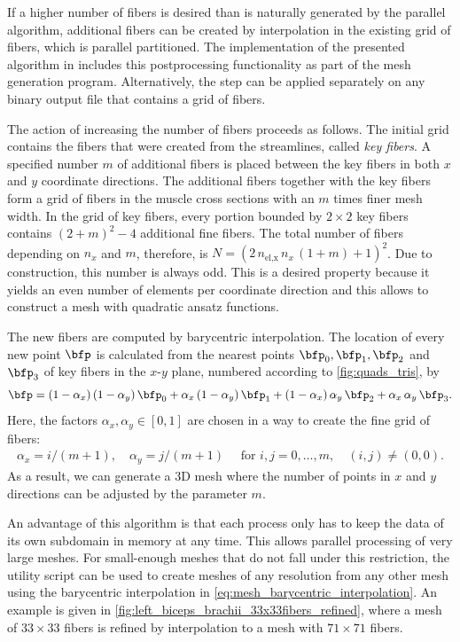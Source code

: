 If a higher number of fibers is desired than is naturally generated by the parallel algorithm, additional fibers can be created by interpolation in the existing grid of fibers, which is parallel partitioned. The implementation of the presented algorithm in \opendihu{} includes this postprocessing functionality as part of the mesh generation program. Alternatively, the step can be applied separately on any binary output file that contains a grid of fibers. 

The action of increasing the number of fibers proceeds as follows. The initial grid contains the fibers that were created from the streamlines, called \emph{key fibers}.
A specified number $m$ of additional fibers is placed between the key fibers in both $x$ and $y$ coordinate directions.
The additional fibers together with the key fibers form a grid of fibers in the muscle cross sections with an $m$ times finer mesh width. In the grid of key fibers, every portion bounded by $2 \times 2$ key fibers contains $(2+m)^2 - 4$ additional fine fibers. The total number of fibers depending on $n_x$ and $m$, therefore, is $N=(2\,n_\text{el,x}\,n_x\,(1+m)+1)^2$. Due to construction, this number is always odd. This is a desired property because it yields an even number of elements per coordinate direction and this allows to construct a mesh with quadratic ansatz functions.

The new fibers are computed by barycentric interpolation. The location of every new point $\bfp$ is calculated from the nearest points $\bfp_0, \bfp_1, \bfp_2$ and $\bfp_3$ of key fibers in the $x$-$y$ plane, numbered according to  \cref{fig:quads_tris}, by%
\begin{align}\label{eq:mesh_barycentric_interpolation}
  \bfp = (1-\alpha_x)\,(1-\alpha_y)\,\bfp_0 + \alpha_x\,(1-\alpha_y)\,\bfp_1 
        + (1-\alpha_x)\,\alpha_y\,\bfp_2 + \alpha_x\,\alpha_y\,\bfp_3.
\end{align}
Here, the factors $\alpha_x,\alpha_y \in [0,1]$ are chosen in a way to create the fine grid of fibers:
%
\begin{align*}
  \alpha_x = i / (m+1), \quad \alpha_y = j / (m+1)\quad \text{ for }i,j = 0, \dots,m, \quad (i,j) \neq (0,0).
\end{align*}
As a result, we can generate a 3D mesh where the number of points in $x$ and $y$ directions can be adjusted by the parameter $m$. 

An advantage of this algorithm is that each process only has to keep the data of its own subdomain in memory at any time. This allows parallel processing of very large meshes. For small-enough meshes that do not fall under this restriction, the utility script  can be used to create meshes of any resolution from any other mesh using the barycentric interpolation in \cref{eq:mesh_barycentric_interpolation}. An example is given in \cref{fig:left_biceps_brachii_33x33fibers_refined}, where a mesh of  $33\times 33$ fibers is refined by interpolation to a mesh with $71\times 71$ fibers.

